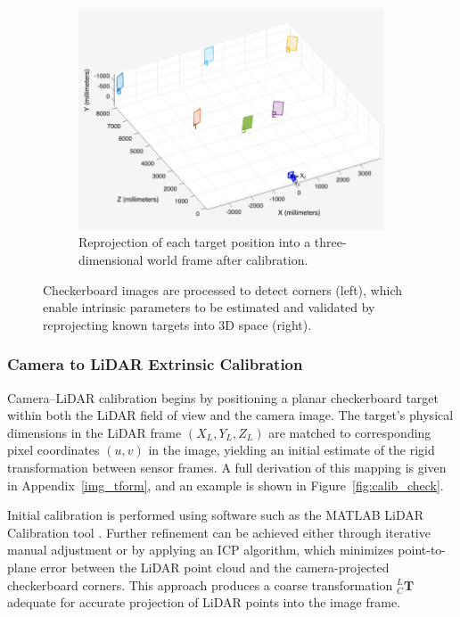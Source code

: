 \documentclass{erauthesis}
\begin{document}
\begin{figure}[htbp]
{\begin{subfigure}[t]{0.625\textwidth}
        \includegraphics[width=\textwidth]{Images/cam_calib_2.png}
        \caption{Reprojection of each target position into a three-dimensional world frame after calibration.}
        \label{fig:cam_calib_2}
    \end{subfigure}%
}
\caption{Checkerboard images are processed to detect corners (left), which enable intrinsic parameters to be estimated and validated by reprojecting known targets into 3D space (right).}
\label{fig:cam_calib}
\end{figure}



\subsubsection{Camera to LiDAR Extrinsic Calibration} \label{camLidar_calib}

Camera–LiDAR calibration begins by positioning a planar checkerboard target within both the LiDAR field of view and the camera image.  
The target’s physical dimensions in the LiDAR frame $(X_L, Y_L, Z_L)$ are matched to corresponding pixel coordinates $(u,v)$ in the image, yielding an initial estimate of the rigid transformation between sensor frames.  
A full derivation of this mapping is given in Appendix~\ref{img_tform}, and an example is shown in Figure~\ref{fig:calib_check}.

Initial calibration is performed using software such as the MATLAB LiDAR Calibration tool \cite{matlab_calibration}.  
Further refinement can be achieved either through iterative manual adjustment or by applying an \ac{ICP} algorithm, which minimizes point-to-plane error between the LiDAR point cloud and the camera-projected checkerboard corners.  
This approach produces a coarse transformation $_{C}^{L}\mathbf{T}$ adequate for accurate projection of LiDAR points into the image frame.
\end{document}
